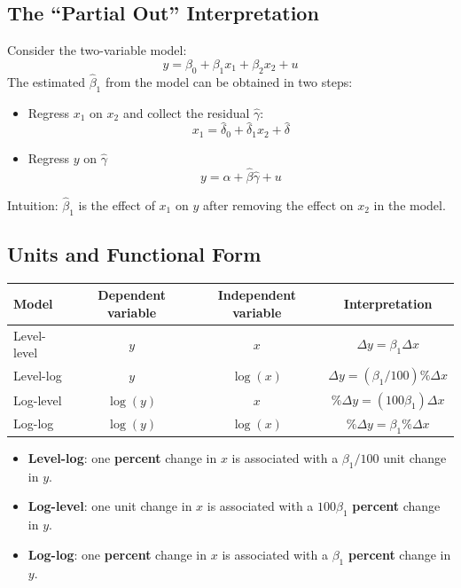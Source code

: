 \documentclass[11pt,a4paper]{article}
\begin{document}
\subsection{The ``Partial Out'' Interpretation}
Consider the two-variable model:
\[
y = \beta_0 + \beta_1 x_1 + \beta_2 x_2 + u
\]
The estimated $\hat{\beta}_1$ from the model can be obtained in two steps:
\begin{itemize}
    \item Regress $x_1$ on $x_2$ and collect the residual $\hat{\gamma}$:
        \[
        x_1 = \hat{\delta}_0 + \hat{\delta}_1 x_2 + \hat{\delta}
        \]
    
    \item Regress $y$ on $\hat{\gamma}$
        \[
        y = \alpha + \hat{\beta} \hat{\gamma} + u
        \]

\end{itemize}
Intuition: $\hat{\beta}_1$ is the effect of $x_1$ on $y$ after removing the effect on $x_2$ in the model. \par

\subsection{Units and Functional Form}
\begin{tabular}{lccc}
    \hline\hline
    Model & Dependent variable & Independent variable & Interpretation \\
    \hline
    Level-level & $y$ & $x$ & $\Delta y = \beta_1 \Delta x$ \\
    Level-log & $y$ & $\log (x)$ & $\Delta y = (\beta_1 / 100) \% \Delta x$  \\
    Log-level & $\log (y)$ & $x$ & $\% \Delta y = (100 \beta_1) \Delta x$ \\
    Log-log & $\log (y)$ & $\log (x)$ & $\% \Delta y = \beta_1 \% \Delta x$ \\
    \hline\hline
\end{tabular}

\begin{itemize}
    \item \textbf{Level-log}: one \textbf{percent} change in $x$ is associated with a $\beta_1 / 100$ unit change in $y$.
    \item \textbf{Log-level}: one unit change in $x$ is associated with a $100 \beta_1$ \textbf{percent} change in $y$.
    \item \textbf{Log-log}: one \textbf{percent} change in $x$ is associated with a $\beta_1$ \textbf{percent} change in $y$.
\end{itemize}
\end{document}
